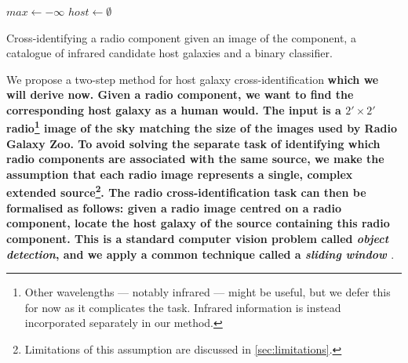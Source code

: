\documentclass[fleqn,usenatbib,usedcolumn]{mnras}
\newcommand{\edited}[1]{{\bf {#1}}}
\begin{document}
    \begin{algorithm}

        $max \leftarrow -\infty$\;
        $host \leftarrow \emptyset$\;

        \caption{Cross-identifying a radio component given an image of the component, a catalogue of infrared candidate host galaxies and a binary classifier.}
        \label{alg:xid}
    \end{algorithm}

    We propose a two-step method for host galaxy cross-identification \edited{which we will derive now. Given a radio component, we want to find the corresponding host galaxy as a human would. The input is a $2' \times 2'$ radio\footnote{Other wavelengths --- notably infrared --- might be useful, but we defer this for now as it complicates the task. Infrared information is instead incorporated separately in our method.} image of the sky matching the size of the images used by Radio Galaxy Zoo. To avoid solving the separate task of identifying which radio components are associated with the same source, we make the assumption that each radio image represents a single, complex extended source\footnote{Limitations of this assumption are discussed in \autoref{sec:limitations}.}. The radio cross-identification task can then be formalised as follows: given a radio image centred on a radio component, locate the host galaxy of the source containing this radio component. This is a standard computer vision problem called \emph{object detection}, and we apply a common technique called a \emph{sliding window} \citep{rowley1996facedetection}}.
\end{document}
